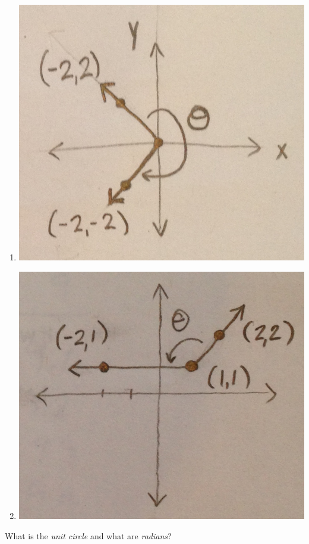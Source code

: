 \documentclass[12pt, a4paper]{article}
\begin{document}
\begin{ex}
\begin{enumerate}
    \item \includegraphics[scale=0.10]{images/angle-3}
    \item \includegraphics[scale=0.10]{images/angle-4}
  \end{enumerate}
\end{ex}
\begin{defi}
  What is the \emph{unit circle} and what are \emph{radians}?
\end{defi}
\end{document}
